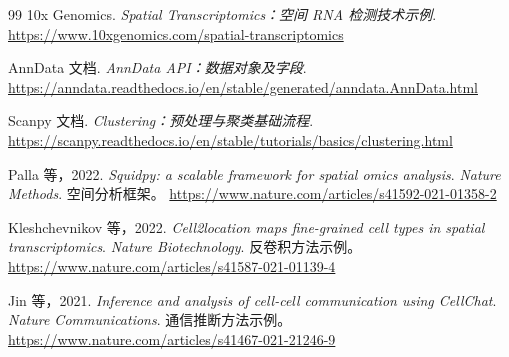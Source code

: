 \documentclass[UTF8,a4paper,11pt,fontset=fandol]{ctexart}
\begin{document}
\begin{thebibliography}{99}
10x Genomics.
\textit{Spatial Transcriptomics：空间 RNA 检测技术示例}.
\url{https://www.10xgenomics.com/spatial-transcriptomics}

AnnData 文档.
\textit{AnnData API：数据对象及字段}.
\url{https://anndata.readthedocs.io/en/stable/generated/anndata.AnnData.html}

Scanpy 文档.
\textit{Clustering：预处理与聚类基础流程}.
\url{https://scanpy.readthedocs.io/en/stable/tutorials/basics/clustering.html}

Palla 等，2022.
\textit{Squidpy: a scalable framework for spatial omics analysis}.
\textit{Nature Methods}. 空间分析框架。
\url{https://www.nature.com/articles/s41592-021-01358-2}

Kleshchevnikov 等，2022.
\textit{Cell2location maps fine-grained cell types in spatial transcriptomics}.
\textit{Nature Biotechnology}. 反卷积方法示例。
\url{https://www.nature.com/articles/s41587-021-01139-4}

Jin 等，2021.
\textit{Inference and analysis of cell-cell communication using CellChat}.
\textit{Nature Communications}. 通信推断方法示例。
\url{https://www.nature.com/articles/s41467-021-21246-9}

\end{thebibliography}
\endgroup
\end{document}
